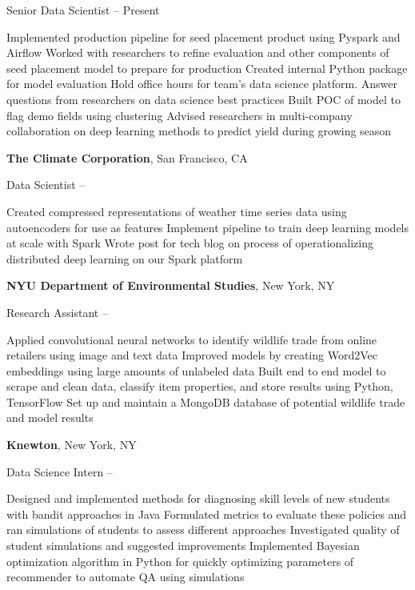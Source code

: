 \documentclass[letterpaper,9.5pt,oneside]{article}
\begin{document}
\begin{body}
\GapNoBreak
Senior Data Scientist
\hfill
{} --
Present 
\begin{detail}
\BulletItem Implemented production pipeline for seed placement product using Pyspark and Airflow
\BulletItem Worked with researchers to refine evaluation and other components of seed placement model to prepare for production
\BulletItem Created internal Python package for model evaluation
\BulletItem Hold office hours for team's data science platform. Answer questions from researchers on data science best practices
\BulletItem Built POC of model to flag demo fields using clustering
\BulletItem Advised researchers in multi-company collaboration on deep learning methods to predict yield during growing season
\end{detail}

\BigGap


\textbf{The Climate Corporation},
San Francisco, CA

\GapNoBreak
Data Scientist
\hfill
{} --
\begin{detail}
\BulletItem Created compressed representations of weather time series data using autoencoders for use as features
\BulletItem Implement pipeline to train deep learning models at scale with Spark
\BulletItem Wrote post for tech blog on process of operationalizing distributed deep learning on our Spark platform
\end{detail}

\BigGap

\textbf{NYU Department of Environmental Studies},
New York, NY

\GapNoBreak
Research Assistant
\hfill
{} --
\begin{detail}
\BulletItem Applied convolutional neural networks to identify wildlife trade from online retailers using image and text data
\BulletItem Improved models by creating Word2Vec embeddings using large amounts of unlabeled data
\BulletItem Built end to end model to scrape and clean data, classify item properties, and store results using Python, TensorFlow
\BulletItem Set up and maintain a MongoDB database of potential wildlife trade and model results
\end{detail}

\BigGap

\textbf{Knewton},
New York, NY

\GapNoBreak
Data Science Intern
\hfill
{} --
\begin{detail}
\BulletItem Designed and implemented methods for diagnosing skill levels of new students with bandit approaches in Java
\BulletItem
Formulated metrics to evaluate these policies and ran simulations of students to assess different approaches
\BulletItem Investigated quality of student simulations and suggested improvements
\BulletItem Implemented Bayesian optimization algorithm in Python for quickly optimizing parameters of recommender to automate QA using simulations
\end{detail}


\end{body}
\end{document}
